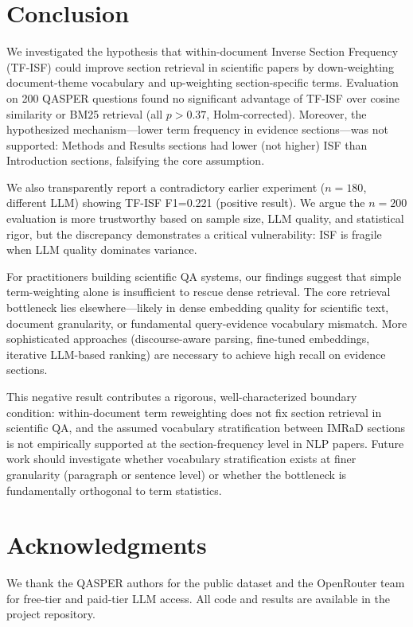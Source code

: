 \documentclass[11pt,letterpaper]{article}
\begin{document}
\section{Conclusion}

We investigated the hypothesis that within-document Inverse Section Frequency
(TF-ISF) could improve section retrieval in scientific papers by down-weighting
document-theme vocabulary and up-weighting section-specific terms. Evaluation on
200 QASPER questions found no significant advantage of TF-ISF over cosine
similarity or BM25 retrieval (all $p > 0.37$, Holm-corrected). Moreover, the
hypothesized mechanism—lower term frequency in evidence sections—was not
supported: Methods and Results sections had lower (not higher) ISF than
Introduction sections, falsifying the core assumption.

We also transparently report a contradictory earlier experiment ($n{=}180$,
different LLM) showing TF-ISF F1=0.221 (positive result). We argue the $n{=}200$
evaluation is more trustworthy based on sample size, LLM quality, and statistical
rigor, but the discrepancy demonstrates a critical vulnerability: ISF is fragile
when LLM quality dominates variance.

For practitioners building scientific QA systems, our findings suggest that simple
term-weighting alone is insufficient to rescue dense retrieval. The core retrieval
bottleneck lies elsewhere—likely in dense embedding quality for scientific text,
document granularity, or fundamental query-evidence vocabulary mismatch. More
sophisticated approaches (discourse-aware parsing, fine-tuned embeddings, iterative
LLM-based ranking) are necessary to achieve high recall on evidence sections.

This negative result contributes a rigorous, well-characterized boundary
condition: within-document term reweighting does not fix section retrieval in
scientific QA, and the assumed vocabulary stratification between IMRaD sections is
not empirically supported at the section-frequency level in NLP papers. Future
work should investigate whether vocabulary stratification exists at finer
granularity (paragraph or sentence level) or whether the bottleneck is
fundamentally orthogonal to term statistics.

\section*{Acknowledgments}

We thank the QASPER authors for the public dataset and the OpenRouter team for
free-tier and paid-tier LLM access. All code and results are available in the
project repository.



\end{document}
